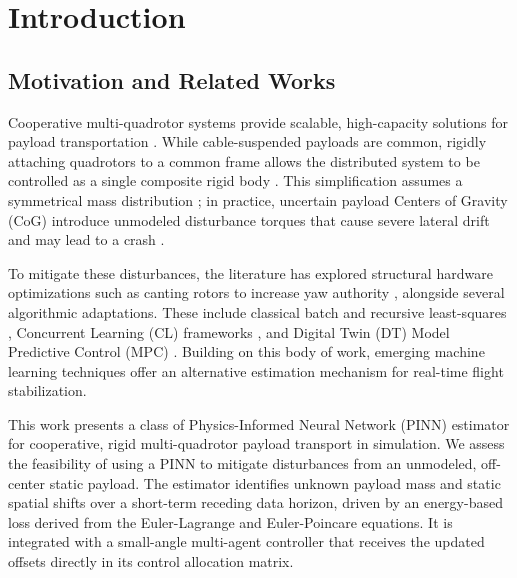 \section{Introduction}

\subsection{Motivation and Related Works}
Cooperative multi-quadrotor systems provide scalable, high-capacity solutions for payload transportation \cite{guebsi_drones_2024, tan_cooperative_2018}. While cable-suspended payloads \cite{zeng_decentralized_2025,peng_modeling_2023} are common, rigidly attaching quadrotors to a common frame allows the distributed system to be controlled as a single composite rigid body \cite{tan_cooperative_2018}. This simplification assumes a symmetrical mass distribution \cite{mellinger2013trajectory, ye_nonlinear_2023}; in practice, uncertain payload Centers of Gravity (CoG) introduce unmodeled disturbance torques that cause severe lateral drift and may lead to a crash \cite{lee_concurrent_2025,farid_digital_2025}.

To mitigate these disturbances, the literature has explored structural hardware optimizations such as canting rotors to increase yaw authority \cite{tan_cooperative_2018}, alongside several algorithmic adaptations. These include classical batch and recursive least-squares \cite{mellinger2013trajectory}, Concurrent Learning (CL) frameworks \cite{lee_concurrent_2025}, and Digital Twin (DT) Model Predictive Control (MPC) \cite{farid_digital_2025}. Building on this body of work, emerging machine learning techniques offer an alternative estimation mechanism for real-time flight stabilization.

This work presents a class of Physics-Informed Neural Network (PINN) estimator for cooperative, rigid multi-quadrotor payload transport in simulation. We assess the feasibility of using a PINN to mitigate disturbances from an unmodeled, off-center static payload. The estimator identifies unknown payload mass and static spatial shifts over a short-term receding data horizon, driven by an energy-based loss derived from the Euler-Lagrange and Euler-Poincare equations. It is integrated with a small-angle multi-agent controller \cite{mellinger2013trajectory} that receives the updated offsets directly in its control allocation matrix.
